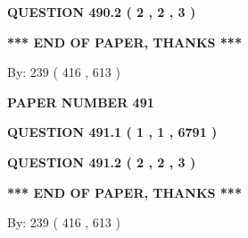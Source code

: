 \documentclass[12pt]{article}
\begin{document}
  
  
\vspace{0.2in}
  
{\textbf{\Large{QUESTION
490.2 
 ( 2 , 2 , 3 )
}}}
  
  
   
   
 \vspace{0.2in}
 
   
   
   
   
\vspace{1.0in} 
{\textbf{\large{ *** END OF PAPER, THANKS *** }}} 
   
   
\hspace{1.0in} By: 
 239 ( 416 ,  613 )
   
   
   
   
\newpage 
\setcounter{page}{ 
   491001 } 
   
   
   
   
 {\textbf{ \Large{ PAPER NUMBER  491  }}}
   
   
\vspace{0.2in}
   
   
   
   
   
   
 \vspace{0.2in}
 
 
 
 
   
   
  
\vspace{0.2in}
  
{\textbf{\Large{QUESTION
491.1 
 ( 1 , 1 , 6791 )
}}}
  
  
  
\vspace{0.2in}
  
{\textbf{\Large{QUESTION
491.2 
 ( 2 , 2 , 3 )
}}}
  
  
   
   
 \vspace{0.2in}
 
   
   
   
   
\vspace{1.0in} 
{\textbf{\large{ *** END OF PAPER, THANKS *** }}} 
   
   
\hspace{1.0in} By: 
 239 ( 416 ,  613 )
   
   
   
\end{document}
